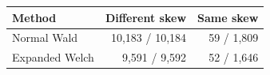 \begin{tabular}{@{}lrr@{}}
\toprule
Method & Different skew & Same skew\\
\midrule
Normal Wald & 10,183 / 10,184 & 59 / 1,809\\
Expanded Welch & 9,591 / 9,592 & 52 / 1,646\\
\bottomrule
\end{tabular}
